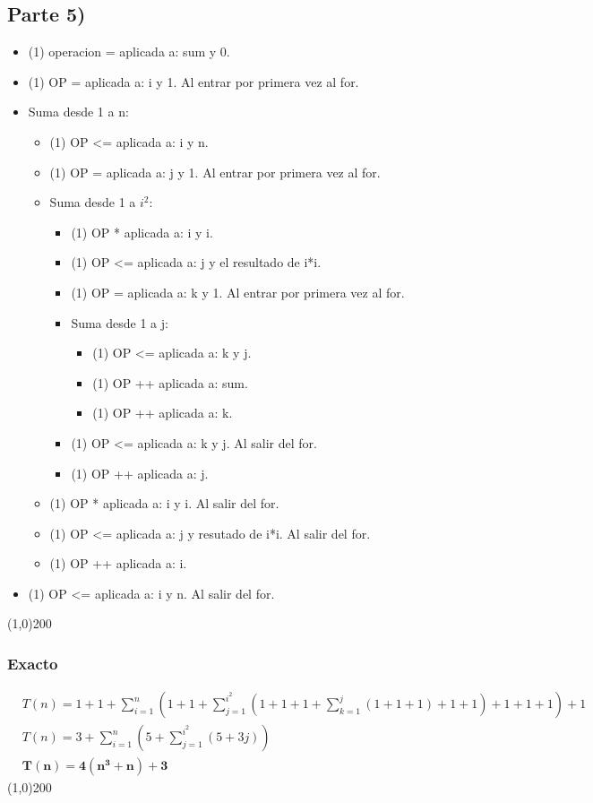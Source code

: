 \documentclass[letterpaper, fleqn]{report}
\begin{document}
\subsection*{Parte 5)}
\begin{itemize}
  \item (1) operacion = aplicada a: sum y 0.
  \item (1) OP = aplicada a: i y 1. Al entrar por primera vez al for.
  \item Suma desde 1 a n:
  \begin{itemize}
    \item (1) OP <= aplicada a: i y n.
    \item (1) OP = aplicada a: j y 1. Al entrar por primera vez al for.
    \item Suma desde 1 a $i^2$:
      \begin{itemize}
        \item (1) OP * aplicada a: i y i.
        \item (1) OP <= aplicada a: j y el resultado de i*i.
        \item (1) OP = aplicada a: k y 1. Al entrar por primera vez al for.
        \item Suma desde 1 a j:
        \begin{itemize}
          \item (1) OP <= aplicada a: k y j.
          \item (1) OP ++ aplicada a: sum.
          \item (1) OP ++ aplicada a: k.
        \end{itemize}
        \item (1) OP <= aplicada a: k y j. Al salir del for.
        \item (1) OP ++ aplicada a: j.
      \end{itemize}
    \item (1) OP * aplicada a: i y i. Al salir del for.
    \item (1) OP <= aplicada a: j y resutado de i*i. Al salir del for.
    \item (1) OP ++ aplicada a: i.
  \end{itemize}
\item (1) OP <= aplicada a: i y n. Al salir del for.
\end{itemize}
\line(1,0){200}
\subsubsection*{Exacto}
\begin{align*}
&T(n) = 1+1+\sum_{i=1}^{n}\left(1+1+\sum_{j=1}^{i^2}{\left(1+1+1+\sum_{k=1}^{j}{(1+1+1)}+1+1\right)}+1+1+1\right) + 1\\
&T(n) = 3 + \sum_{i=1}^{n}{(5+\sum_{j=1}^{i^2}{(5+3j)})} \\ 
&\mathbf{T(n) = 4(n^3+n)+3}
\end{align*}
\line(1,0){200}
\end{document}
